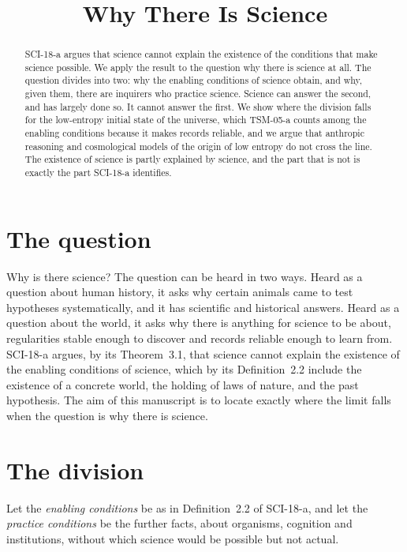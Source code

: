 \documentclass{situationist-preprint}
\title{Why There Is Science}
\begin{document}
\maketitle

\begin{abstract}
SCI-18-a argues that science cannot explain the existence of the conditions that make science possible. We apply the result to the question why there is science at all. The question divides into two: why the enabling conditions of science obtain, and why, given them, there are inquirers who practice science. Science can answer the second, and has largely done so. It cannot answer the first. We show where the division falls for the low-entropy initial state of the universe, which TSM-05-a counts among the enabling conditions because it makes records reliable, and we argue that anthropic reasoning and cosmological models of the origin of low entropy do not cross the line. The existence of science is partly explained by science, and the part that is not is exactly the part SCI-18-a identifies.
\end{abstract}

\section{The question}

Why is there science? The question can be heard in two ways. Heard as a question about human history, it asks why certain animals came to test hypotheses systematically, and it has scientific and historical answers. Heard as a question about the world, it asks why there is anything for science to be about, regularities stable enough to discover and records reliable enough to learn from. SCI-18-a argues, by its Theorem~3.1, that science cannot explain the existence of the enabling conditions of science, which by its Definition~2.2 include the existence of a concrete world, the holding of laws of nature, and the past hypothesis. The aim of this manuscript is to locate exactly where the limit falls when the question is why there is science.

\section{The division}

Let the \emph{enabling conditions} be as in Definition~2.2 of SCI-18-a, and let the \emph{practice conditions} be the further facts, about organisms, cognition and institutions, without which science would be possible but not actual.
\end{document}
